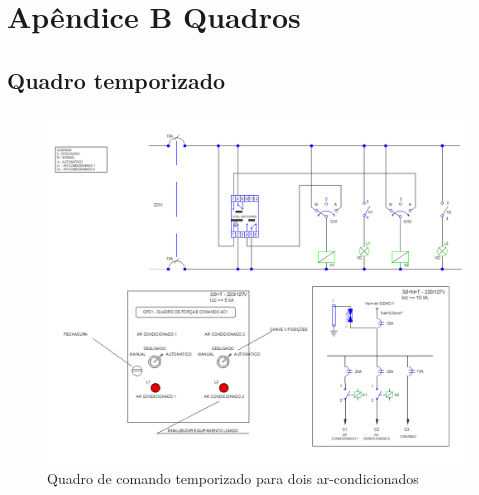\section{Apêndice B Quadros} \label{Appendix B Quadros}

\subsection{Quadro temporizado}
	\begin{figure}[H]
	\centering
		\includegraphics[angle=90, width=18cm, keepaspectratio]{Figures/8. Boards/Appendix-Temp 2AR.png}
	\hfill
	\caption{Quadro de comando temporizado para dois ar-condicionados}
	\label{fig: temp 2AR}
\end{figure}
\newpage
